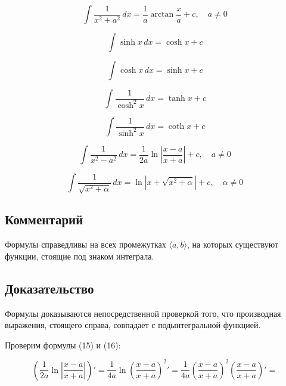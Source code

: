 {\begin{equation}
\int \frac{1}{x^2 + a^2} \,dx = \frac{1}{a} \arctan \frac{x}{a} + c, \quad a \neq 0
\end{equation}

\begin{equation}
\int \sinh x \,dx = \cosh x + c
\end{equation}

\begin{equation}
\int \cosh x \,dx = \sinh x + c
\end{equation}

\begin{equation}
\int \frac{1}{\cosh^2 x} \,dx = \tanh x + c
\end{equation}

\begin{equation}
\int \frac{1}{\sinh^2 x} \,dx = \coth x + c
\end{equation}

\begin{equation}
\int \frac{1}{x^2 - a^2} \,dx = \frac{1}{2a} \ln \left| \frac{x - a}{x + a} \right| + c, \quad a \neq 0
\end{equation}

\begin{equation}
\int \frac{1}{\sqrt{x^2 + \alpha}} \,dx = \ln \left| x + \sqrt{x^2 + \alpha} \right| + c, \quad \alpha \neq 0
\end{equation}

\subsection*{Комментарий}

Формулы справедливы на всех промежутках \( \langle a, b \rangle \), на которых существуют функции, стоящие под знаком интеграла.

\subsection*{Доказательство}

Формулы доказываются непосредственной проверкой того, что производная выражения, стоящего справа, совпадает с подынтегральной функцией.

Проверим формулы (15) и (16):

\begin{equation}
\left( \frac{1}{2a} \ln \left| \frac{x - a}{x + a} \right| \right)' = \frac{1}{4a} \ln \left( \frac{x - a}{x + a} \right)^2' = \frac{1}{4a} \left( \frac{x - a}{x + a} \right)^2 \left( \frac{x - a}{x + a} \right)' = 
\end{equation}

}
